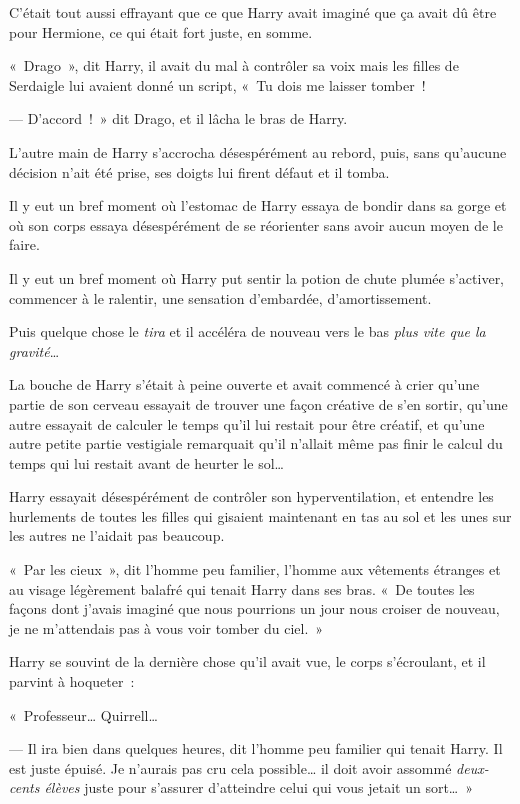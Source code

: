 C'était tout aussi effrayant que ce que Harry avait imaginé que ça avait dû être pour Hermione, ce qui était fort juste, en somme.

«~Drago~», dit Harry, il avait du mal à contrôler sa voix mais les filles de Serdaigle lui avaient donné un script, «~Tu dois me laisser tomber~!

--- D'accord~!~»
dit Drago, et il lâcha le bras de Harry.

L'autre main de Harry s'accrocha désespérément au rebord, puis, sans qu'aucune décision n'ait été prise, ses doigts lui firent défaut et il tomba.

Il y eut un bref moment où l'estomac de Harry essaya de bondir dans sa gorge et où son corps essaya désespérément de se réorienter sans avoir aucun moyen de le faire.

Il y eut un bref moment où Harry put sentir la potion de chute plumée s'activer, commencer à le ralentir, une sensation d'embardée, d'amortissement.

Puis quelque chose le \emph{tira} et il accéléra de nouveau vers le bas \emph{plus vite que la gravité}…

La bouche de Harry s'était à peine ouverte et avait commencé à crier qu'une partie de son cerveau essayait de trouver une façon créative de s'en sortir, qu'une autre essayait de calculer le temps qu'il lui restait pour être créatif, et qu'une autre petite partie vestigiale remarquait qu'il n'allait même pas finir le calcul du temps qui lui restait avant de heurter le sol…

\later

Harry essayait désespérément de contrôler son hyperventilation, et entendre les hurlements de toutes les filles qui gisaient maintenant en tas au sol et les unes sur les autres ne l'aidait pas beaucoup.

«~Par les cieux~», dit l'homme peu familier, l'homme aux vêtements étranges et au visage légèrement balafré qui tenait Harry dans ses bras.
«~De toutes les façons dont j'avais imaginé que nous pourrions un jour nous croiser de nouveau, je ne m'attendais pas à vous voir tomber du ciel.~»

Harry se souvint de la dernière chose qu'il avait vue, le corps s'écroulant, et il parvint à hoqueter~:

«~Professeur…
Quirrell…

--- Il ira bien dans quelques heures, dit l'homme peu familier qui tenait Harry.
Il est juste épuisé.
Je n'aurais pas cru cela possible… il doit avoir assommé \emph{deux-cents élèves} juste pour s'assurer d'atteindre celui qui vous jetait un sort…~»

